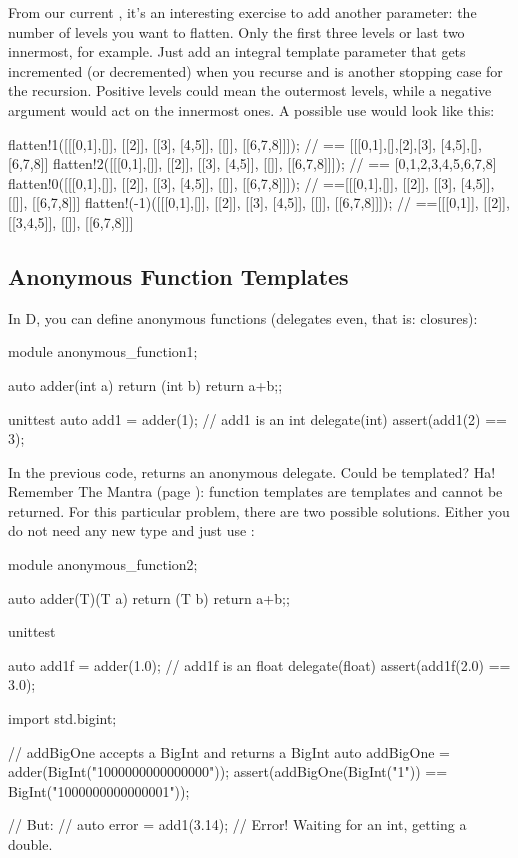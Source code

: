 From our current , it's an interesting exercise to add another parameter: the number of levels you want to flatten. Only the first three levels or last two innermost, for example. Just add an integral template parameter that gets incremented (or decremented) when you recurse and is another stopping case for the recursion. Positive levels could mean the outermost levels, while a negative argument would act on the innermost ones. A possible use would look like this:

\begin{dcode}
flatten!1([[[0,1],[]], [[2]], [[3], [4,5]], [[]], [[6,7,8]]]);
     // == [[[0,1],[],[2],[3], [4,5],[],[6,7,8]]
flatten!2([[[0,1],[]], [[2]], [[3], [4,5]], [[]], [[6,7,8]]]);
     // == [0,1,2,3,4,5,6,7,8]
flatten!0([[[0,1],[]], [[2]], [[3], [4,5]], [[]], [[6,7,8]]]);
     // ==[[[0,1],[]], [[2]], [[3], [4,5]], [[]], [[6,7,8]]]
flatten!(-1)([[[0,1],[]], [[2]], [[3], [4,5]], [[]], [[6,7,8]]]);
     // ==[[[0,1]], [[2]], [[3,4,5]], [[]], [[6,7,8]]]
\end{dcode}

\subsection{Anonymous Function Templates}\label{anonymousfunctions}

In D, you can define anonymous functions (delegates even, that is: closures):

\begin{dcode}
module anonymous_function1;

auto adder(int a)
{
    return (int b) { return a+b;};
}

unittest
{
    auto add1 = adder(1); // add1 is an int delegate(int)
    assert(add1(2) == 3);
}
\end{dcode}

In the previous code,  returns an anonymous delegate. Could  be templated? Ha! Remember The Mantra (page \pageref{mantra}): function templates are templates and cannot be returned. For this particular problem, there are two possible solutions. Either you do not need any new type and just use :

\begin{dcode}
module anonymous_function2;

auto adder(T)(T a)
{
    return (T b) { return a+b;};
}

unittest
{
    auto add1f = adder(1.0); // add1f is an float delegate(float)
    assert(add1f(2.0) == 3.0);

    import std.bigint;

    // addBigOne accepts a BigInt and returns a BigInt
    auto addBigOne = adder(BigInt("1000000000000000"));
    assert(addBigOne(BigInt("1")) == BigInt("1000000000000001"));

    // But:
    // auto error = add1(3.14); // Error! Waiting for an int, getting a double.
}
\end{dcode}

